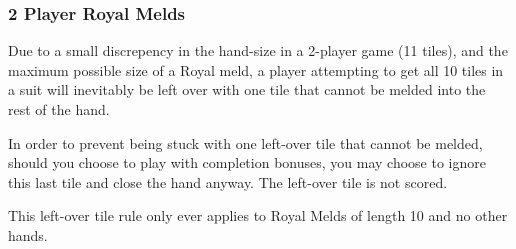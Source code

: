 \subsubsection{2 Player Royal Melds}
Due to a small discrepency in the hand-size in a 2-player game (11 tiles), and the maximum possible size of a Royal meld, a player attempting to get all 10 tiles in a suit will inevitably be left over with one tile that cannot be melded into the rest of the hand.

In order to prevent being stuck with one left-over tile that cannot be melded, should you choose to play with completion bonuses, you may choose to ignore this last tile and close the hand anyway. The left-over tile is not scored.

\note This left-over tile rule only ever applies to Royal Melds of length 10 and no other hands.